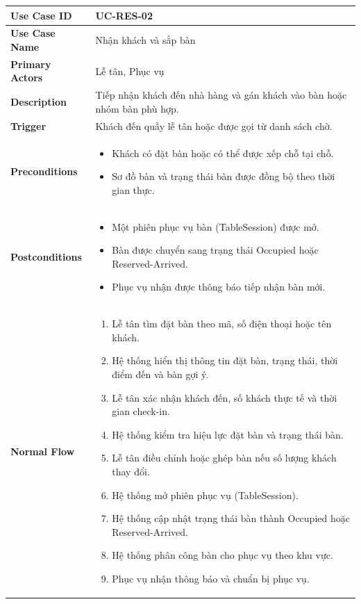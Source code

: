 \begin{longtable}{|p{4cm}|p{10cm}|}
\hline
\textbf{Use Case ID} & UC-RES-02 \\ \hline
\textbf{Use Case Name} & Nhận khách và sắp bàn \\ \hline
\textbf{Primary Actors} & Lễ tân, Phục vụ \\ \hline

\textbf{Description} & Tiếp nhận khách đến nhà hàng và gán khách vào bàn hoặc nhóm bàn phù hợp. \\ \hline

\textbf{Trigger} & Khách đến quầy lễ tân hoặc được gọi từ danh sách chờ. \\ \hline

\textbf{Preconditions} &
\begin{itemize}[leftmargin=*, noitemsep]
  \item Khách có đặt bàn hoặc có thể được xếp chỗ tại chỗ.
  \item Sơ đồ bàn và trạng thái bàn được đồng bộ theo thời gian thực.
\end{itemize} \\ \hline

\textbf{Postconditions} &
\begin{itemize}[leftmargin=*, noitemsep]
  \item Một phiên phục vụ bàn (\textsf{TableSession}) được mở.
  \item Bàn được chuyển sang trạng thái \textsf{Occupied} hoặc \textsf{Reserved-Arrived}.
  \item Phục vụ nhận được thông báo tiếp nhận bàn mới.
\end{itemize} \\ \hline

\textbf{Normal Flow} &
\begin{enumerate}[leftmargin=*, noitemsep]
  \item Lễ tân tìm đặt bàn theo mã, số điện thoại hoặc tên khách.
  \item Hệ thống hiển thị thông tin đặt bàn, trạng thái, thời điểm đến và bàn gợi ý.
  \item Lễ tân xác nhận khách đến, số khách thực tế và thời gian check-in.
  \item Hệ thống kiểm tra hiệu lực đặt bàn và trạng thái bàn.
  \item Lễ tân điều chỉnh hoặc ghép bàn nếu số lượng khách thay đổi.
  \item Hệ thống mở phiên phục vụ (\textsf{TableSession}).
  \item Hệ thống cập nhật trạng thái bàn thành \textsf{Occupied} hoặc \textsf{Reserved-Arrived}.
  \item Hệ thống phân công bàn cho phục vụ theo khu vực.
  \item Phục vụ nhận thông báo và chuẩn bị phục vụ.
\end{enumerate} \\ \hline


\end{longtable}
